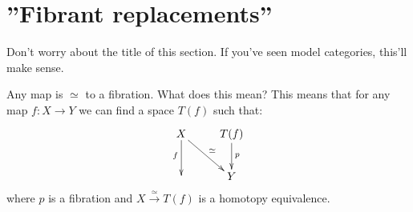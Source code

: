\section{''Fibrant replacements''}
Don't worry about the title of this section. If you've seen model categories, this'll make sense.
\begin{theorem}
    Any map is $\simeq$ to a fibration. What does this mean? This means that for any map $f:X\to Y$ we can find a space $T(f)$ such that:
    \begin{equation*}
	\xymatrix{
	    X\ar[dr]^{\simeq}\ar[d]_f & T(f)\ar[d]^p\\
	    & Y
	    }
    \end{equation*}
    where $p$ is a fibration and $X\xrightarrow{\simeq} T(f)$ is a homotopy equivalence.
\end{theorem}
